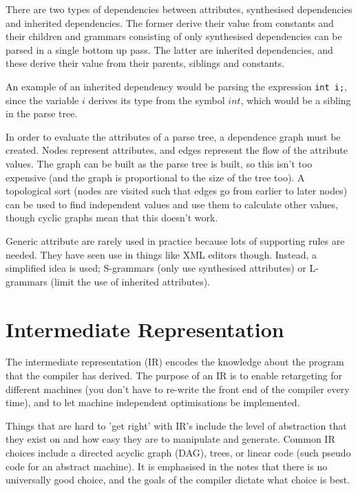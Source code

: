 
There are two types of dependencies between attributes, synthesised
dependencies and inherited dependencies. The former derive their value
from constants and their children and grammars consisting of only
synthesised dependencies can be parsed in a single bottom up pass. The
latter are inherited dependencies, and these derive their value from
their parents, siblings and constants.

An example of an inherited dependency would be parsing the
expression \texttt{int i;}, since the variable $i$ derives its type
from the symbol $int$, which would be a sibling in the parse tree.


In order to evaluate the attributes of a parse tree, a dependence
graph must be created. Nodes represent attributes, and edges represent
the flow of the attribute values. The graph can be built as the parse
tree is built, so this isn't too expensive (and the graph is
proportional to the size of the tree too). A topological sort (nodes
are visited such that edges go from earlier to later nodes) can be
used to find independent values and use them to calculate other
values, though cyclic graphs mean that this doesn't work.

Generic attribute are rarely used in practice because lots of
supporting rules are needed. They have seen use in things like XML
editors though. Instead, a simplified idea is used; S-grammars (only
use synthesised attributes) or L-grammars (limit the use of inherited
attributes).



\section{Intermediate Representation}

The intermediate representation (IR) encodes the knowledge about the
program that the compiler has derived. The purpose of an IR is to
enable retargeting for different machines (you don't have to re-write
the front end of the compiler every time), and to let machine
independent optimisations be implemented.

Things that are hard to 'get right' with IR's include the level of
abstraction that they exist on and how easy they are to manipulate and
generate. Common IR choices include a directed acyclic graph (DAG),
trees, or linear code (such pseudo code for an abstract machine). It
is emphasised in the notes that there is no universally good choice,
and the goals of the compiler dictate what choice is best.

